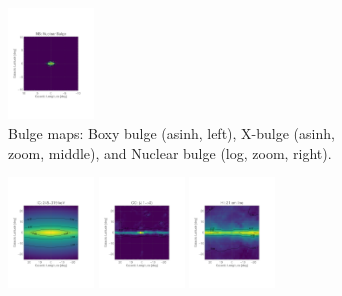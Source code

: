 \documentclass[doublespace,nopageskip]{VTthesis}
\begin{document}
\begin{figure}
\begin{subfigure}[h]{1\textwidth}
		\includegraphics[width=0.25\textwidth,trim=0.44in 2.03in 1.29in 2.34in,clip=true]{Figures/511keV/map_NB_log_grid_20x20.pdf}
		\caption{Bulge maps: Boxy bulge (asinh, left), X-bulge (asinh, zoom, middle), and Nuclear bulge (log, zoom, right).}\label{fig:BB_map}\label{fig:XB_map}\label{fig:NB_map}
	\end{subfigure}
	\begin{subfigure}[h]{1\textwidth}
		\centering
		\includegraphics[width=0.25\textwidth,trim=0.44in 2.03in 1.29in 2.34in,clip=true]{Figures/511keV/map_IC0245-0319_asinh_grid.pdf}
		\includegraphics[width=0.25\textwidth,trim=0.44in 2.03in 1.29in 2.34in,clip=true]{Figures/511keV/map_CO_asinh_grid.pdf}
		\includegraphics[width=0.25\textwidth,trim=0.44in 2.03in 1.29in 2.34in,clip=true]{Figures/511keV/map_HI_asinh_grid.pdf}

\end{subfigure}
\end{figure}
\end{document}
